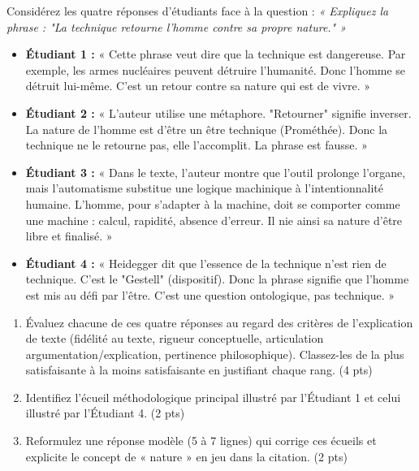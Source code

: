 \documentclass[11pt]{article}
\begin{document}
\begin{exercice}
Considérez les quatre réponses d'étudiants face à la question : \textit{« Expliquez la phrase : "La technique retourne l'homme contre sa propre nature." »}

\begin{itemize}
    \item \textbf{Étudiant 1 :} « Cette phrase veut dire que la technique est dangereuse. Par exemple, les armes nucléaires peuvent détruire l'humanité. Donc l'homme se détruit lui-même. C'est un retour contre sa nature qui est de vivre. »
    \item \textbf{Étudiant 2 :} « L'auteur utilise une métaphore. "Retourner" signifie inverser. La nature de l'homme est d'être un être technique (Prométhée). Donc la technique ne le retourne pas, elle l'accomplit. La phrase est fausse. »
    \item \textbf{Étudiant 3 :} « Dans le texte, l'auteur montre que l'outil prolonge l'organe, mais l'automatisme substitue une logique machinique à l'intentionnalité humaine. L'homme, pour s'adapter à la machine, doit se comporter comme une machine : calcul, rapidité, absence d'erreur. Il nie ainsi sa nature d'être libre et finalisé. »
    \item \textbf{Étudiant 4 :} « Heidegger dit que l'essence de la technique n'est rien de technique. C'est le "Gestell" (dispositif). Donc la phrase signifie que l'homme est mis au défi par l'être. C'est une question ontologique, pas technique. »
\end{itemize}
\begin{enumerate}
    \item Évaluez chacune de ces quatre réponses au regard des critères de l'explication de texte (fidélité au texte, rigueur conceptuelle, articulation argumentation/explication, pertinence philosophique). Classez-les de la plus satisfaisante à la moins satisfaisante en justifiant chaque rang. (4 pts)
    \item Identifiez l'écueil méthodologique principal illustré par l'Étudiant 1 et celui illustré par l'Étudiant 4. (2 pts)
    \item Reformulez une réponse modèle (5 à 7 lignes) qui corrige ces écueils et explicite le concept de « nature » en jeu dans la citation. (2 pts)
\end{enumerate}
\end{exercice}
\end{document}
